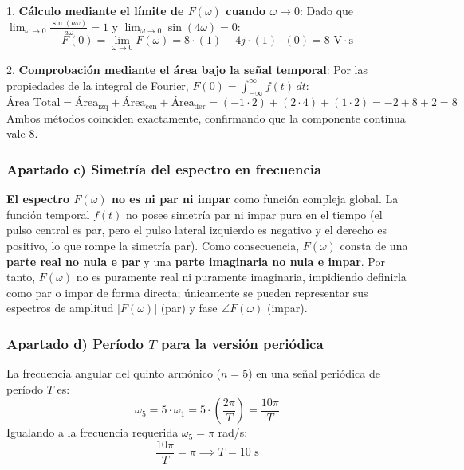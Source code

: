 \begin{resolucion}
1. \textbf{Cálculo mediante el límite de $F(\omega)$ cuando $\omega \to 0$}:
   Dado que $\lim_{\omega \to 0} \frac{\sin(a\omega)}{a\omega} = 1$ y $\lim_{\omega \to 0} \sin(4\omega) = 0$:
   \[
   F(0) = \lim_{\omega \to 0} F(\omega) = 8 \cdot (1) - 4j \cdot (1) \cdot (0) = 8 \text{ V}\cdot\text{s}
   \]

2. \textbf{Comprobación mediante el área bajo la señal temporal}:
   Por las propiedades de la integral de Fourier, $F(0) = \int_{-\infty}^{\infty} f(t) \, dt$:
   \[
   \text{Área Total} = \text{Área}_{\text{izq}} + \text{Área}_{\text{cen}} + \text{Área}_{\text{der}} = (-1 \cdot 2) + (2 \cdot 4) + (1 \cdot 2) = -2 + 8 + 2 = 8
   \]
   Ambos métodos coinciden exactamente, confirmando que la componente continua vale \textbf{$8$}.

\subsubsection*{Apartado c) Simetría del espectro en frecuencia}

\textbf{El espectro $F(\omega)$ no es ni par ni impar} como función compleja global.
La función temporal $f(t)$ no posee simetría par ni impar pura en el tiempo (el pulso central es par, pero el pulso lateral izquierdo es negativo y el derecho es positivo, lo que rompe la simetría par).
Como consecuencia, $F(\omega)$ consta de una \textbf{parte real no nula e par} y una \textbf{parte imaginaria no nula e impar}. Por tanto, $F(\omega)$ no es puramente real ni puramente imaginaria, impidiendo definirla como par o impar de forma directa; únicamente se pueden representar sus espectros de amplitud $|F(\omega)|$ (par) y fase $\angle F(\omega)$ (impar).

\subsubsection*{Apartado d) Período $T$ para la versión periódica}

La frecuencia angular del quinto armónico ($n=5$) en una señal periódica de período $T$ es:
\[
\omega_5 = 5 \cdot \omega_1 = 5 \cdot \left(\frac{2\pi}{T}\right) = \frac{10\pi}{T}
\]
Igualando a la frecuencia requerida $\omega_5 = \pi$ rad/s:
\[
\frac{10\pi}{T} = \pi \implies T = 10 \text{ s}
\]
\end{resolucion}

